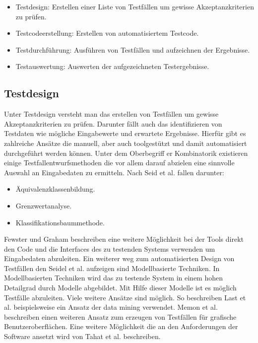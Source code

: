 \begin{itemize}
	  \itemsep0pt
      \item Testdesign: Erstellen einer Liste von Testfällen um gewisse Akzeptanzkriterien zu prüfen.
      \item Testcodeerstellung: Erstellen von automatisiertem Testcode.
      \item Testdurchführung: Ausführen von Testfällen und aufzeichnen der Ergebnisse.
      \item Testauswertung: Auswerten der aufgezeichneten Testergebnisse.         
\end{itemize}

\subsection{Testdesign}
\label{subsec:testdesign}
Unter Testdesign versteht man das erstellen von Testfällen um gewisse Akzeptanzkriterien zu prüfen. Darunter fällt auch das identifizieren von Testdaten wie mögliche Eingabewerte und erwartete Ergebnisse. Hierfür gibt es zahlreiche Ansätze die manuell, aber auch toolgestützt und damit automatisiert durchgeführt werden können.
Unter dem Oberbegriff er Kombinatorik existieren einige Testfallentwurfsmethoden die vor allem darauf abzielen eine sinnvolle Auswahl an Eingabedaten zu ermitteln.
Nach Seid et al. fallen darunter: \cite[Seite 27]{seidl_basiswissen_2012}
\begin{itemize}
	  \itemsep0pt
      \item Äquivalenzklassenbildung.
      \item Grenzwertanalyse.
      \item Klassifikationsbaummethode.
\end{itemize}
Fewster und Graham \cite[Seite 19 ff.]{fewster_software_1999} beschreiben eine weitere Möglichkeit bei der Tools direkt den Code und die Interfaces des zu testenden Systems verwenden um Eingabedaten abzuleiten.
Ein weiterer weg zum automatisierten Design von Testfällen den Seidel et al. aufzeigen \cite[Seite 33]{seidl_basiswissen_2012} sind Modellbasierte Techniken. In Modellbasierten Techniken wird das zu testende System in einem hohen Detailgrad durch Modelle abgebildet. Mit Hilfe dieser Modelle ist es möglich Testfälle abzuleiten.
Viele weitere Ansätze sind möglich. So beschreiben Last et al. beispielsweise ein Ansatz der data mining verwendet. \cite{last_data_2003}
Memon et al. beschreiben einen weiteren Ansatz zum erzeugen von Testfällen für grafische Benutzeroberflächen. \cite{memon_using_1999}
Eine weitere Möglichkeit die an den Anforderungen der Software ansetzt wird von Tahat et al. beschreiben. \cite{tahat_requirement-based_2001}

